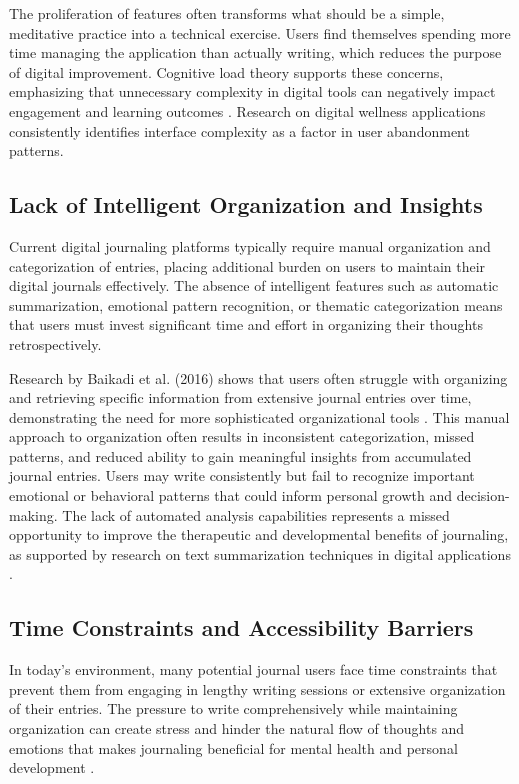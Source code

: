 The proliferation of features often transforms what should be a simple, meditative practice into a technical exercise. Users find themselves spending more time managing the application than actually writing, which reduces the purpose of digital improvement. Cognitive load theory supports these concerns, emphasizing that unnecessary complexity in digital tools can negatively impact engagement and learning outcomes \cite{sloan2015efficacy}. Research on digital wellness applications consistently identifies interface complexity as a factor in user abandonment patterns.

\subsection{Lack of Intelligent Organization and Insights}\label{subsec:lack-intelligence}

Current digital journaling platforms typically require manual organization and categorization of entries, placing additional burden on users to maintain their digital journals effectively. The absence of intelligent features such as automatic summarization, emotional pattern recognition, or thematic categorization means that users must invest significant time and effort in organizing their thoughts retrospectively.

Research by Baikadi et al. (2016) shows that users often struggle with organizing and retrieving specific information from extensive journal entries over time, demonstrating the need for more sophisticated organizational tools \cite{baikadi2016exploring}. This manual approach to organization often results in inconsistent categorization, missed patterns, and reduced ability to gain meaningful insights from accumulated journal entries. Users may write consistently but fail to recognize important emotional or behavioral patterns that could inform personal growth and decision-making. The lack of automated analysis capabilities represents a missed opportunity to improve the therapeutic and developmental benefits of journaling, as supported by research on text summarization techniques in digital applications \cite{allahyari2017text}.

\subsection{Time Constraints and Accessibility Barriers}\label{subsec:time-constraints}

In today's environment, many potential journal users face time constraints that prevent them from engaging in lengthy writing sessions or extensive organization of their entries. The pressure to write comprehensively while maintaining organization can create stress and hinder the natural flow of thoughts and emotions that makes journaling beneficial for mental health and personal development \cite{pennebaker1999forming}.

